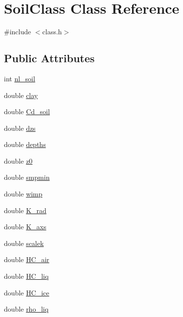 \hypertarget{class_soil_class}{}\section{Soil\+Class Class Reference}
\label{class_soil_class}


{\ttfamily \#include $<$class.\+h$>$}

\subsection*{Public Attributes}
\begin{DoxyCompactItemize}
\item 
int \hyperlink{class_soil_class_a27812d464d62749188b98c79ad7190cb}{nl\+\_\+soil}
\item 
double \hyperlink{class_soil_class_a7d46c0a4c4879d4a3537c0bdbea68d1f}{clay}
\item 
double \hyperlink{class_soil_class_a0e505985e7418389cb1aa1aa4d6901a7}{Cd\+\_\+soil}
\item 
double \hyperlink{class_soil_class_ad6033bd4d137d9ed22ad2bab9aa7bc04}{dzs}
\item 
double \hyperlink{class_soil_class_a654b48fd7371c4990e3f25248775ba86}{depths}
\item 
double \hyperlink{class_soil_class_affec2cb4274ce8cda22fdda7700ef6d9}{z0}
\item 
double \hyperlink{class_soil_class_a1ae96ac63620ccae65e81031f40c8162}{smpmin}
\item 
double \hyperlink{class_soil_class_a493cd824eaaf70a8ba3d21f2957c5705}{wimp}
\item 
double \hyperlink{class_soil_class_addca186661f9d5cac4a206ff76741e9e}{K\+\_\+rad}
\item 
double \hyperlink{class_soil_class_ac5db5fdfdc94d3b420e25fe859853a49}{K\+\_\+axs}
\item 
double \hyperlink{class_soil_class_aaaefa8ea8b54b470c23f9e28ecc3889d}{scalek}
\item 
double \hyperlink{class_soil_class_a007f1d1edcda478c6f8c8e8af0841d92}{H\+C\+\_\+air}
\item 
double \hyperlink{class_soil_class_a116e0f8c926b2ad1c95347255c0466ef}{H\+C\+\_\+liq}
\item 
double \hyperlink{class_soil_class_a1da69654a0dc4f53ad119082456a566c}{H\+C\+\_\+ice}
\item 
double \hyperlink{class_soil_class_a24b81ba26cde43e27b1509f0166aafc1}{rho\+\_\+liq}
\item 

\end{DoxyCompactItemize}
